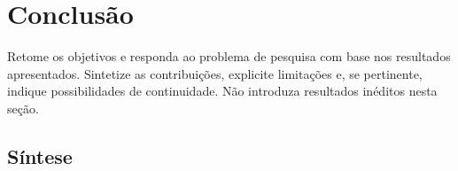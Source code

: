 \chapter{Conclusão}
\label{cap:conclusao}

Retome os objetivos e responda ao problema de pesquisa com base nos
resultados apresentados. Sintetize as contribuições, explicite limitações
e, se pertinente, indique possibilidades de continuidade. Não introduza
resultados inéditos nesta seção.

\section{Síntese}

